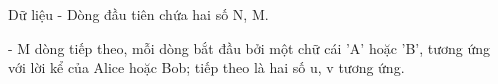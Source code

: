 Dữ liệu
- Dòng đầu tiên chứa hai số N, M.   


   - M dòng tiếp theo, mỗi dòng bắt đầu bởi một chữ cái 'A' hoặc 'B', tương ứng với lời kể của Alice hoặc Bob; tiếp theo là hai số u, v tương ứng.